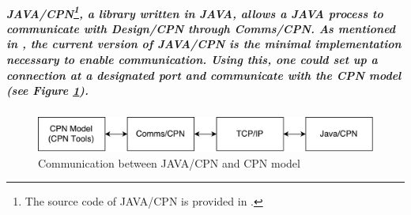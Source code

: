 \subparagraph*{\textnormal{JAVA/CPN\footnote{The source code of JAVA/CPN is provided in \cite{CPN_Tools_Comms/CPN}.}, a library written in JAVA, allows a JAVA process to communicate with Design/CPN through Comms/CPN. As mentioned in \cite{gallasch2001comms}, the current version of JAVA/CPN is the minimal implementation necessary to enable communication. Using this, one could set up a connection at a designated port and communicate with the CPN model (see Figure \ref{fig:DBN_Impl_Comms_Architecture_JAVA_CPN}).
}}
\begin{figure}[!htbp]
	\centering
	\includegraphics[scale = 0.35]{DBN_Impl_Comms_Architecture_JAVA_CPN.pdf}
	\caption{Communication between JAVA/CPN and CPN model}
	\label{fig:DBN_Impl_Comms_Architecture_JAVA_CPN}
\end{figure}

